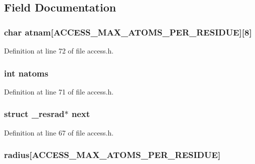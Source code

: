 \subsection{Field Documentation}
\hypertarget{struct__resrad_ac08cbe1b837e92bdf4dae30413c28e04}{
\subsubsection[{atnam}]{\setlength{\rightskip}{0pt plus 5cm}char atnam\mbox{[}{\bf A\-C\-C\-E\-S\-S\-\_\-\-M\-A\-X\-\_\-\-A\-T\-O\-M\-S\-\_\-\-P\-E\-R\-\_\-\-R\-E\-S\-I\-D\-U\-E}\mbox{]}\mbox{[}8\mbox{]}}}\label{struct__resrad_ac08cbe1b837e92bdf4dae30413c28e04}


Definition at line 72 of file access.\-h.

\hypertarget{struct__resrad_a2093ca3426a8f98873fe165a55bfa2b1}{
\subsubsection[{natoms}]{\setlength{\rightskip}{0pt plus 5cm}int natoms}}\label{struct__resrad_a2093ca3426a8f98873fe165a55bfa2b1}


Definition at line 71 of file access.\-h.

\hypertarget{struct__resrad_a695ca7589e88ba7b5a26d6b5078725e9}{
\subsubsection[{next}]{\setlength{\rightskip}{0pt plus 5cm}struct {\bf \-\_\-resrad}$\ast$ next}}\label{struct__resrad_a695ca7589e88ba7b5a26d6b5078725e9}


Definition at line 67 of file access.\-h.

\hypertarget{struct__resrad_aee5b20c4f5853fe287f250c2ab32ec77}{
\subsubsection[{radius}]{ radius\mbox{[}{\bf A\-C\-C\-E\-S\-S\-\_\-\-M\-A\-X\-\_\-\-A\-T\-O\-M\-S\-\_\-\-P\-E\-R\-\_\-\-R\-E\-S\-I\-D\-U\-E}\mbox{]}}}\label{struct__resrad_aee5b20c4f5853fe287f250c2ab32ec77}


